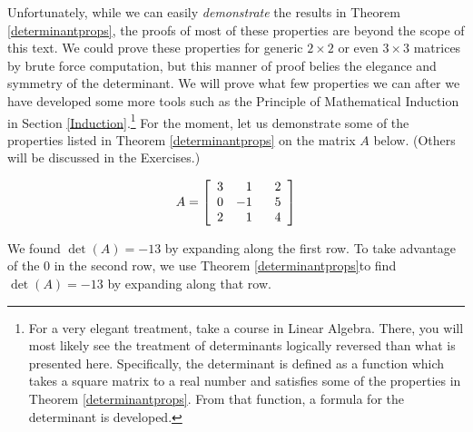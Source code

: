 \smallskip

Unfortunately, while we can easily \textit{demonstrate} the results in Theorem \ref{determinantprops}, the proofs of most of these properties are beyond the scope of this text.  We could prove these properties for generic $2 \times 2$ or even $3 \times 3$ matrices by brute force computation, but this manner of proof belies the elegance and symmetry of the determinant.  We will prove what few properties we can after we have developed some more tools such as the Principle of Mathematical Induction in Section \ref{Induction}.\footnote{For a very elegant treatment, take a course in Linear Algebra.  There, you will most likely see the treatment of determinants logically reversed than what is presented here.  Specifically, the determinant is defined as a function which takes a square matrix to a real number and satisfies some of the properties in Theorem \ref{determinantprops}. From that function, a formula for the determinant is developed.}  For the moment, let us demonstrate some of the properties listed in Theorem \ref{determinantprops} on the matrix $A$ below.  (Others will be discussed in the Exercises.)

\[A =  \left[ \begin{array}{rrr} 3 & 1 & \hphantom{-}2 \\ 0 & -1 & 5 \\ 2 & 1 & 4 \\ \end{array} \right] \]

We found $\det(A) = -13$ by expanding along the first row.  To take advantage of the $0$ in the second row, we use Theorem \ref{determinantprops}to find $\det(A) = -13$ by expanding along that row.

